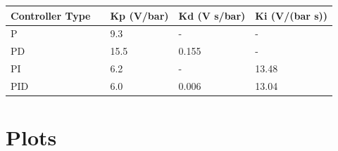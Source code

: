 \documentclass{article}
\begin{document}
\begin{table}[h]
\begin{center}
\begin{tabular}{|l|l|l|l|l|}
\hline
Controller Type    &  & Kp (V/bar) & Kd (V s/bar) & Ki (V/(bar s)) \\ \hline
    \hline
P   &  & 9.3        & -            & -                \\ \hline
PD  &  & 15.5       & 0.155        & -               \\ \hline
PI  &  & 6.2        & -             & 13.48          \\ \hline
PID &  & 6.0        & 0.006        & 13.04          \\ \hline
\end{tabular}
\end{center}
\end{table}

\newpage
\section{Plots}
\end{document}
